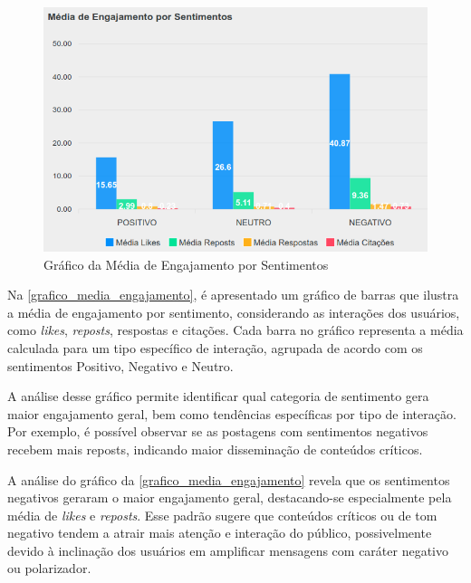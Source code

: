 \documentclass[
	12pt,				%
	oneside,			%
	a4paper,			%
	english,			%
	french,				%
	spanish,			%
	brazil				%
	]{abntex2}
\begin{document}
\begin{figure}[htbp]
\hypertarget{grafico_media_engajamento}{%
\caption{Gráfico da Média de Engajamento por Sentimentos}\label{grafico_media_engajamento}
\begin{center}
\includegraphics[scale=0.3]{imagens/sentilytics/estudo-caso/media_engajamento_por_sentimento.png}
\end{center}
}
\end{figure}

Na \autoref{grafico_media_engajamento}, é apresentado um gráfico de
barras que ilustra a média de engajamento por sentimento, considerando
as interações dos usuários, como \emph{likes}, \emph{reposts}, respostas
e citações. Cada barra no gráfico representa a média calculada para um
tipo específico de interação, agrupada de acordo com os sentimentos
Positivo, Negativo e Neutro.

A análise desse gráfico permite identificar qual categoria de sentimento
gera maior engajamento geral, bem como tendências específicas por tipo
de interação. Por exemplo, é possível observar se as postagens com
sentimentos negativos recebem mais reposts, indicando maior disseminação
de conteúdos críticos.

A análise do gráfico da \autoref{grafico_media_engajamento} revela que
os sentimentos negativos geraram o maior engajamento geral,
destacando-se especialmente pela média de \emph{likes} e \emph{reposts}.
Esse padrão sugere que conteúdos críticos ou de tom negativo tendem a
atrair mais atenção e interação do público, possivelmente devido à
inclinação dos usuários em amplificar mensagens com caráter negativo ou
polarizador.
\end{document}
